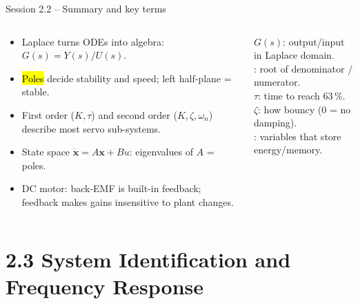 \documentclass[aspectratio=169,10pt]{beamer}
\begin{document}
\begin{frame}{Session 2.2 -- Summary and key terms}
\begin{columns}[T]
\begin{keybox}
\footnotesize
\begin{itemize}
  \item Laplace turns ODEs into algebra: $G(s)=Y(s)/U(s)$.
  \item \hl{Poles} decide stability and speed; left half-plane = stable.
  \item First order ($K,\tau$) and second order ($K,\zeta,\omega_n$) describe most servo sub-systems.
  \item State space $\dot{\bm x}=A\bm x+Bu$: eigenvalues of $A$ = poles.
  \item DC motor: back-EMF is built-in feedback; feedback makes gains insensitive to plant changes.
\end{itemize}
\end{keybox}
\begin{defbox}
\footnotesize
{} $G(s)$: output/input in Laplace domain.\\
: root of denominator / numerator.\\
 $\tau$: time to reach 63\,\%.\\
 $\zeta$: how bouncy (0 = no damping).\\
: variables that store energy/memory.
\end{defbox}
\end{columns}
\end{frame}

\section{2.3 System Identification and Frequency Response}
\end{document}
